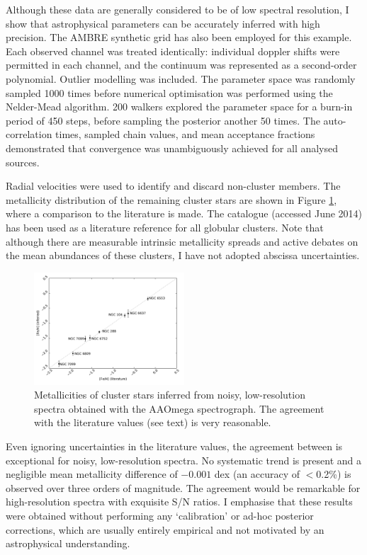 \documentclass[iop]{emulateapj}
\begin{document}
Although these data are generally considered to be of low spectral resolution, 
I show that astrophysical parameters can be accurately inferred with high 
precision. The AMBRE synthetic grid has also been employed for this example. 
Each observed channel was treated identically: individual doppler shifts were 
permitted in each channel, and the continuum was represented as a second-order 
polynomial. Outlier modelling was included.
The parameter space was randomly sampled 1000 times before numerical optimisation 
was performed using the Nelder-Mead algorithm. 200 walkers explored the parameter 
space for a burn-in period of 450 steps, before sampling the posterior another 
50 times. The auto-correlation times, sampled chain values, and mean acceptance 
fractions demonstrated that convergence was unambiguously achieved for all 
analysed sources.

Radial velocities were used to identify and discard non-cluster members. The 
metallicity distribution of the remaining cluster stars are shown in Figure 
\ref{fig:clusters}, where a comparison to the literature is made. The 
\citet{harris} catalogue (accessed June 2014) has been used as a literature 
reference for all globular clusters. Note that although there are measurable 
intrinsic metallicity spreads and active debates on the mean abundances 
of these clusters, I have not adopted abscissa uncertainties.

\begin{figure}[h!]
\label{fig:clusters}
\includegraphics[width=0.5\textwidth]{clusters.pdf}
\caption{Metallicities of cluster stars inferred from noisy, low-resolution 
spectra obtained with the AAOmega spectrograph. The agreement with the 
literature values (see text) is very reasonable.}
\end{figure}

Even ignoring uncertainties in the literature values, the agreement between is 
exceptional for noisy, low-resolution spectra. No systematic trend is present 
and a negligible mean metallicity difference of $-0.001$ dex (an accuracy of $<$0.2\%) 
is observed over three orders of magnitude. The agreement would be remarkable 
for high-resolution spectra with exquisite S/N ratios. I emphasise that these 
results were obtained without performing any `calibration' or ad-hoc posterior 
corrections, which are usually entirely empirical and not motivated by an 
astrophysical understanding.
\end{document}
